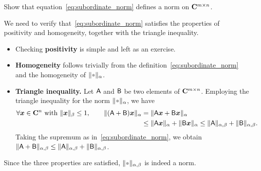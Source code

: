 \begin{exercise}
    Show that equation~\eqref{eq:subordinate_norm} defines a norm on $\mathbf C^{m \times n}$.
\end{exercise}
\begin{solution}
    We need to verify that~\eqref{eq:subordinate_norm} satisfies the properties of positivity and homogeneity,
    together with the triangle inequality.
    \begin{itemize}
        \item
            Checking \textbf{positivity} is simple and left as an exercise.

        \item
            \textbf{Homogeneity} follows trivially from the definition~\eqref{eq:subordinate_norm}
            and the homogeneity of $\norm{\placeholder}_{\alpha}$.

        \item
            \textbf{Triangle inequality.}
            Let $\mathsf A$ and $\mathsf B$ be two elements of $\mathbf C^{m \times n}$.
            Employing the triangle inequality for the norm $\norm{\placeholder}_{\alpha}$,
            we have
            \begin{align*}
                \forall \mathbf{\boldsymbol{x}} \in \mathbf C^{n} ~ \text{with} ~ \lVert\mathbf{\boldsymbol{x}}\rVert_{\beta}\leq 1, \qquad
                \lVert(\mathsf A + \mathsf B) \mathbf{\boldsymbol{x}}\rVert_{\alpha}
                &= \lVert\mathsf A \mathbf{\boldsymbol{x}} + \mathsf B \mathbf{\boldsymbol{x}}\rVert_{\alpha} \\
                &\leq \lVert\mathsf A \mathbf{\boldsymbol{x}}\rVert_{\alpha} + \lVert\mathsf B \mathbf{\boldsymbol{x}}\rVert_{\alpha}
                \leq \lVert\mathsf A\rVert_{\alpha,\beta} + \lVert\mathsf B\rVert_{\alpha,\beta}.
            \end{align*}
            Taking the supremum as in~\eqref{eq:subordinate_norm},
            we obtain $\lVert\mathsf A + \mathsf B\rVert_{\alpha,\beta} \leq \lVert\mathsf A\rVert_{\alpha,\beta} + \lVert\mathsf B\rVert_{\alpha,\beta}$.
    \end{itemize}
    Since the three properties are satisfied, $\norm{\placeholder}_{\alpha,\beta}$ is indeed a norm.
\end{solution}

